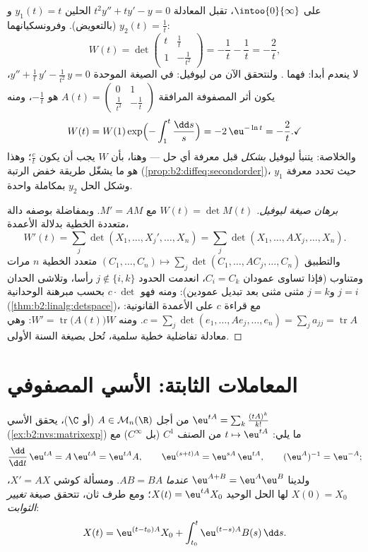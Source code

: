 \begin{example}\label{ex:b2:diffeq:eulerwronskian}
على $\intoo{0}{\infty}$، تقبل المعادلة $t^2y'' + ty' - y = 0$ الحلين $y_1(t) = t$ و$y_2(t) = \frac1t$ (بالتعويض).
وفرونسكيانهما:
\[
W(t) = \det\begin{pmatrix} t & \tfrac1t\\[2pt]
1 & -\tfrac{1}{t^2}\end{pmatrix}
= -\frac1t - \frac1t = -\frac2t ,
\]
لا ينعدم أبدا: فهما . ولنتحقق الآن من ليوفيل: في الصيغة
الموحدة $y'' + \frac1t\,y' - \frac{1}{t^2}\,y = 0$، يكون أثر المصفوفة المرافقة $A(t) = \begin{pmatrix} 0 & 1\\ \frac{1}{t^2}
& -\frac1t\end{pmatrix}$ هو $-\frac1t$، ومنه
\[
W(t) = W(1)\exp\Bigl(-\int_1^t\frac{\dd s}{s}\Bigr)
= -2\,\eu^{-\ln t} = -\frac2t . \checkmark
\]
والخلاصة: يتنبأ ليوفيل \emph{بشكل}  قبل معرفة أي حل ---
وهنا، بأن $W$ يجب أن يكون $\frac{c}{t}$؛ وهذا هو ما يشغّل طريقة خفض
الرتبة (\cref{prop:b2:diffeq:secondorder})، حيث تحدد معرفة $y_1$ وشكل  الحل $y_2$
بمكاملة واحدة.
\end{example}

\begin{proof}[برهان صيغة ليوفيل]
$W(t) = \det M(t)$ مع $M' = AM$. وبمفاضلة  بوصفه دالة متعددة الخطية بدلالة
الأعمدة،
\[
W'(t) = \sum_j \det(X_1, \dots, X_j', \dots, X_n)
= \sum_j \det(X_1, \dots, AX_j, \dots, X_n) .
\]
والتطبيق $(C_1, \dots, C_n) \mapsto \sum_j \det(C_1, \dots,
AC_j, \dots, C_n)$ متعدد الخطية $n$ مرات ومتناوب (فإذا تساوى عمودان
$C_i = C_k$، انعدمت الحدود $j \notin \{i, k\}$ رأسا، وتلاشى الحدان $j = i$ و$j = k$
مثنى مثنى بعد تبديل عمودين): ومنه فهو $c \cdot \det$ بحسب مبرهنة الوحدانية
(\cref{thm:b2:linalg:detspace})، مع قراءة $c$ على الأعمدة القانونية: $c = \sum_j \det(e_1, \dots, Ae_j, \dots,
e_n) = \sum_j a_{jj} = \operatorname{tr} A$. ومنه
$W' =
\operatorname{tr}\bigl(A(t)\bigr)W$: وهي معادلة تفاضلية خطية سلمية، تُحل بصيغة السنة الأولى.
\end{proof}

\section{المعاملات الثابتة: الأسي المصفوفي}

\begin{theorem}\label{thm:b2:diffeq:matrixexp}
من أجل $A \in \mathcal{M}_n(\R)$ (أو $\C$)، يحقق الأسي $\eu^{tA}
= \sum_k \frac{(tA)^k}{k!}$ (\cref{ex:b2:nvs:matrixexp}) ما يلي:
$t \mapsto \eu^{tA}$ من الصنف $C^1$ (بل $C^\infty$) مع
\[
\frac{\dd}{\dd t}\,\eu^{tA} = A\,\eu^{tA} = \eu^{tA}A ,
\qquad
\eu^{(s+t)A} = \eu^{sA}\,\eu^{tA},
\qquad
(\eu^{A})^{-1} = \eu^{-A} ;
\]
ولدينا $\eu^{A + B} = \eu^A\eu^B$ \emph{عندما} $AB = BA$. ومسألة كوشي
$X' = AX$، $X(0) = X_0$ لها الحل الوحيد $X(t) =
\eu^{tA}X_0$؛ ومع طرف ثان، تتحقق صيغة
\emph{تغيير الثوابت}:
\[
X(t) = \eu^{(t - t_0)A}X_0 + \int_{t_0}^{t} \eu^{(t-s)A}B(s)\,\dd
s .
\]
\end{theorem}

